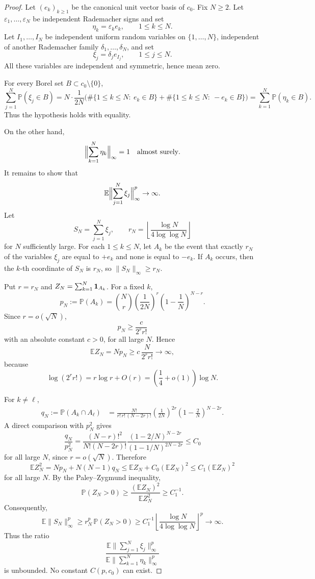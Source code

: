 \documentclass[11pt]{article}
\begin{document}
\begin{proof}
Let \((e_k)_{k\geq 1}\) be the canonical unit vector basis of \(c_0\).  Fix
\(N\geq 2\).  Let \(\varepsilon_1,\ldots,\varepsilon_N\) be independent
Rademacher signs and set
\[
   \eta_k=\varepsilon_k e_k,\qquad 1\leq k\leq N.
\]
Let \(I_1,\ldots,I_N\) be independent uniform random variables on
\(\{1,\ldots,N\}\), independent of another Rademacher family
\(\delta_1,\ldots,\delta_N\), and set
\[
   \xi_j=\delta_j e_{I_j},\qquad 1\leq j\leq N.
\]
All these variables are independent and symmetric, hence mean zero.

For every Borel set \(B\subset c_0\setminus\{0\}\),
\[
\sum_{j=1}^N {\mathbb P}(\xi_j\in B)
=
N\cdot \frac{1}{2N}
\bigl(
\#\{1\leq k\leq N:\ e_k\in B\}
+\#\{1\leq k\leq N:\ -e_k\in B\}
\bigr)
=
\sum_{k=1}^N {\mathbb P}(\eta_k\in B).
\]
Thus the hypothesis holds with equality.

On the other hand,
\[
   \Bigl\|\sum_{k=1}^N \eta_k\Bigr\|_\infty=1
   \quad\text{almost surely}.
\]
It remains to show that
\[
   {\mathbb E}\Bigl\|\sum_{j=1}^N \xi_j\Bigr\|_\infty^p\to\infty.
\]
Let
\[
   S_N=\sum_{j=1}^N \xi_j,
   \qquad
   r_N=\left\lfloor\frac{\log N}{4\log\log N}\right\rfloor
\]
for \(N\) sufficiently large.  For each \(1\leq k\leq N\), let \(A_k\) be the
event that exactly \(r_N\) of the variables \(\xi_j\) are equal to \(+e_k\)
and none is equal to \(-e_k\).  If \(A_k\) occurs, then the \(k\)-th coordinate
of \(S_N\) is \(r_N\), so \(\|S_N\|_\infty\geq r_N\).

Put \(r=r_N\) and \(Z_N=\sum_{k=1}^N {\bf 1}_{A_k}\).  For a fixed \(k\),
\[
   p_N:={\mathbb P}(A_k)
   =\binom{N}{r}\left(\frac{1}{2N}\right)^r
     \left(1-\frac{1}{N}\right)^{N-r}.
\]
Since \(r=o(\sqrt N)\),
\[
   p_N\geq \frac{c}{2^r r!}
\]
with an absolute constant \(c>0\), for all large \(N\).  Hence
\[
   {\mathbb E}Z_N=Np_N
   \geq
   c\,\frac{N}{2^r r!}\to\infty,
\]
because
\[
   \log(2^r r!)=r\log r+O(r)
   =\left(\frac{1}{4}+o(1)\right)\log N.
\]

For \(k\neq \ell\),
\[
\begin{split}
   q_N:={\mathbb P}(A_k\cap A_\ell)
   &=
   \frac{N!}{r!\,r!\,(N-2r)!}
   \left(\frac{1}{2N}\right)^{2r}
   \left(1-\frac{2}{N}\right)^{N-2r}.
\end{split}
\]
A direct comparison with \(p_N^2\) gives
\[
   \frac{q_N}{p_N^2}
   =
   \frac{(N-r)!^2}{N!(N-2r)!}
   \frac{ (1-2/N)^{N-2r}}{ (1-1/N)^{2N-2r}}
   \leq C_0
\]
for all large \(N\), since \(r=o(\sqrt N)\).  Therefore
\[
   {\mathbb E}Z_N^2
   =Np_N+N(N-1)q_N
   \leq {\mathbb E}Z_N + C_0({\mathbb E}Z_N)^2
   \leq C_1({\mathbb E}Z_N)^2
\]
for all large \(N\).  By the Paley--Zygmund inequality,
\[
   {\mathbb P}(Z_N>0)
   \geq \frac{({\mathbb E}Z_N)^2}{ {\mathbb E}Z_N^2}
   \geq C_1^{-1}.
\]
Consequently,
\[
   {\mathbb E}\|S_N\|_\infty^p
   \geq r_N^p\,{\mathbb P}(Z_N>0)
   \geq C_1^{-1}
      \left\lfloor\frac{\log N}{4\log\log N}\right\rfloor^p
   \to\infty.
\]
Thus the ratio
\[
 \frac{{\mathbb E}\|\sum_{j=1}^N\xi_j\|_\infty^p}
      {{\mathbb E}\|\sum_{k=1}^N\eta_k\|_\infty^p}
\]
is unbounded.  No constant \(C(p,c_0)\) can exist.
\end{proof}
\end{document}
